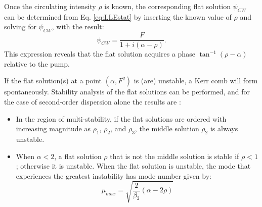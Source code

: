 	
	

Once the circulating intensity $\rho$ is known, the corresponding flat solution $\psi_{CW}$ can be determined from Eq. \ref{eq:LLEstat} by inserting the known value of $\rho$ and solving for $\psi_{CW}$, with the result:
\begin{equation}
\psi_{CW}=\frac{F}{1+i(\alpha-\rho)}.\label{eq:LLEflatsoln}
\end{equation}
This expression reveals that the flat solution acquires a phase $\tan^{-1}(\rho-\alpha)$ relative to the pump.



If the flat solution(s) at a point $(\alpha,F^2)$ is (are) unstable, a Kerr comb will form spontaneously. Stability analysis of the flat solutions can be performed, and for the case of second-order dispersion alone the results are \cite{Godey2014}:
\begin{itemize}
	\item In the region of multi-stability, if the flat solutions are ordered with increasing magnitude as $\rho_1$, $\rho_2$, and $\rho_3$, the middle solution $\rho_2$ is always unstable. 
	\item When $\alpha<2$, a flat solution $\rho$ that is not the middle solution is stable if $\rho<1$; otherwise it is unstable. When the flat solution is unstable, the mode that experiences the greatest instability has mode number given by:
	\begin{equation}
\mu_{max}=\sqrt{\frac{2}{\beta_2}(\alpha-2\rho)}  \label{eq:mumax}
	\end{equation} 
\end{itemize}

